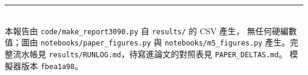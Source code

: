 \documentclass[11pt]{article}
\begin{document}
\vspace{1em}
\noindent\rule{\linewidth}{0.4pt}\\[0.3em]
{\small 本報告由 \texttt{code/make\_report3090.py} 自 \texttt{results/} 的 CSV 產生，
無任何硬編數值；圖由 \texttt{notebooks/paper\_figures.py} 與 \texttt{notebooks/m5\_figures.py}
產生。完整流水帳見 \texttt{results/RUNLOG.md}，待寫進論文的對照表見 \texttt{PAPER\_DELTAS.md}。
模擬器版本 \texttt{fbea1a98}。}
\end{document}
